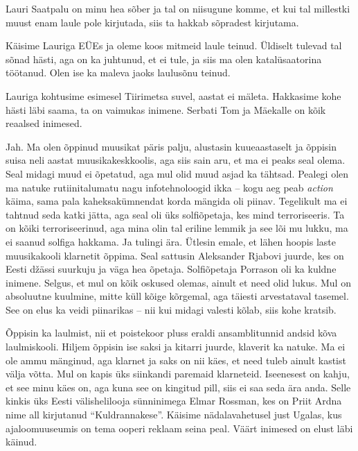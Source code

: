 Lauri Saatpalu on minu hea sõber ja tal on niisugune komme, et kui tal 
millestki muust enam laule pole kirjutada, siis ta hakkab sõpradest kirjutama. 


Käisime Lauriga EÜEs ja oleme koos mitmeid laule teinud. 
Üldiselt tulevad tal sõnad hästi, aga on ka juhtunud, et ei tule, ja siis ma olen 
katalüsaatorina töötanud. Olen ise ka maleva jaoks laulusõnu teinud. 

Lauriga kohtusime esimesel Tiirimetsa suvel, aastat ei mäleta. Hakkasime kohe hästi läbi saama, 
ta on vaimukas inimene. Serbati Tom ja 
Mäekalle on kõik reaalsed 
inimesed.


Jah. Ma olen õppinud muusikat päris palju, alustasin kuueaastaselt ja 
õppisin suisa neli aastat muusikakeskkoolis, 
aga siis sain aru, et ma ei peaks seal olema. Seal midagi muud ei õpetatud, aga mul olid muud asjad ka tähtsad. 
Pealegi olen ma natuke rutiinitalumatu nagu infotehnoloogid ikka -- kogu aeg peab \emph{action} käima, sama pala kaheksakümnendat 
korda mängida oli piinav. Tegelikult ma ei tahtnud seda katki jätta, aga seal oli üks solfiõpetaja, kes mind terroriseeris. Ta on 
kõiki terroriseerinud, aga mina olin tal eriline lemmik ja see lõi mu lukku, ma 
ei saanud solfiga hakkama. Ja tulingi ära. Ütlesin emale, et lähen hoopis
laste muusikakooli klarnetit 
õppima. Seal sattusin Aleksander Rjabovi 
juurde, kes on Eesti džässi suurkuju ja väga hea õpetaja. Solfiõpetaja
Porrason oli ka kuldne inimene. 
Selgus, et mul on kõik oskused olemas, ainult et need olid lukus. Mul 
on absoluutne kuulmine, mitte küll kõige kõrgemal, aga täiesti arvestataval 
tasemel. See on elus ka veidi piinarikas -- nii kui midagi 
valesti kõlab, siis kohe kratsib. 

Õppisin ka laulmist, nii et poistekoor pluss eraldi ansamblitunnid andsid kõva laulmiskooli. Hiljem õppisin ise saksi ja kitarri 
juurde, klaverit ka natuke. Ma ei ole ammu mänginud, aga klarnet ja saks on 
nii käes, et need tuleb ainult kastist välja võtta. Mul on 
kapis üks siinkandi paremaid klarneteid. Iseenesest on kahju, et see minu käes on, aga kuna see on kingitud pill, 
siis ei saa seda ära anda. Selle kinkis üks 
Eesti välishelilooja sünninimega Elmar Rossman, kes on Priit Ardna nime all kirjutanud \enquote{Kuldrannakese}. Käisime nädalavahetusel just Ugalas, kus ajaloomuuseumis
on tema ooperi reklaam seina peal. Väärt inimesed on elust läbi 
käinud.

